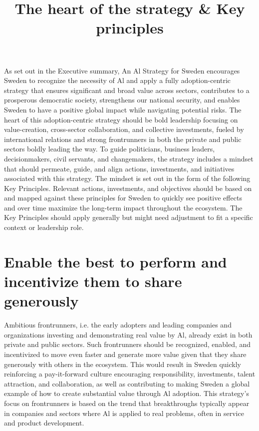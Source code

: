 \title{
The heart of the strategy \& Key principles
}
As set out in the Executive summary, An Al Strategy for Sweden encourages Sweden to recognize the necessity of Al and apply a fully adoption-centric strategy that ensures significant and broad value across sectors, contributes to a prosperous democratic society, strengthens our national security, and enables Sweden to have a positive global impact while navigating potential risks.
The heart of this adoption-centric strategy should be bold leadership focusing on value-creation, cross-sector collaboration, and collective investments, fueled by international relations and strong frontrunners in both the private and public sectors boldly leading the way.
To guide politicians, business leaders, decisionmakers, civil servants, and changemakers, the strategy includes a mindset that should permeate, guide, and align actions, investments, and initiatives associated with this strategy.
The mindset is set out in the form of the following Key Principles.
Relevant actions, investments, and objectives should be based on and mapped against these principles for Sweden to quickly see positive effects and over time maximize the long-term impact throughout the ecosystem.
The Key Principles should apply generally but might need adjustment to fit a specific context or leadership role.
\section*{Enable the best to perform and incentivize them to share generously}
Ambitious frontrunners, i.e. the early adopters and leading companies and organizations investing and demonstrating real value by \(\mathrm{Al}\), already exist in both private and public sectors.
Such frontrunners should be recognized, enabled, and incentivized to move even faster and generate more value given that they share generously with others in the ecosystem. This would result in Sweden quickly reinforcing a pay-it-forward culture encouraging responsibility, investments, talent attraction, and collaboration, as well as contributing to making Sweden a global example of how to create substantial value through Al adoption.
This strategy's focus on frontrunners is based on the trend that breakthroughs typically appear in companies and sectors where Al is applied to real problems, often in service and product development.

